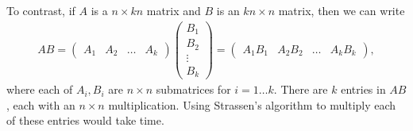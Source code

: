 \documentclass[Chapter04]{subfiles}
\begin{document}
\begin{enumerate}
\begin{answer}
			To contrast, if $A$ is a $n \times kn$ matrix and $B$ is an $kn \times n$ matrix, then we can write
			\begin{align*}
				AB =
				\begin{pmatrix}
					A_1 & A_2 & \dots & A_k
				\end{pmatrix}
				\begin{pmatrix}
					B_1\\
					B_2\\
					\vdots\\
					B_k
				\end{pmatrix}
				=
				\begin{pmatrix}
					A_1B_1 & A_2B_2 & \dots & A_kB_k
				\end{pmatrix},
			\end{align*}
			where each of $A_i,B_i$ are $n \times n$ submatrices for $i = 1 \dots k$. There are $k$ entries in $AB$, each with an $n \times n$ multiplication. Using Strassen's algorithm to multiply each of these entries would take  time.
		\end{answer}


\end{enumerate}
\end{document}
